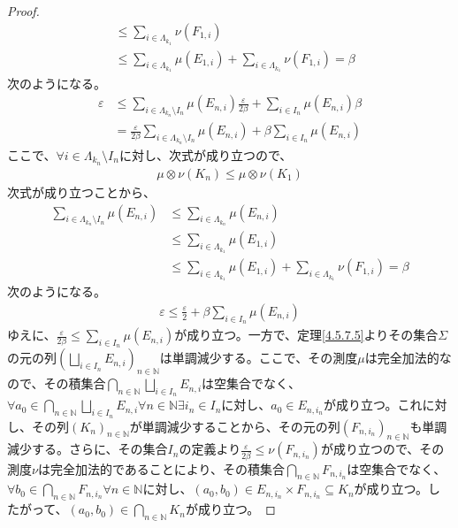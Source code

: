 \documentclass[dvipdfmx]{jsarticle}
\begin{document}
\begin{proof}
\begin{align*}
&\leq \sum_{i \in \varLambda_{k_{1}}} {\nu\left( F_{1,i} \right)}\\
&\leq \sum_{i \in \varLambda_{k_{1}}} {\mu\left( E_{1,i} \right)} + \sum_{i \in \varLambda_{k_{1}}} {\nu\left( F_{1,i} \right)} = \beta
\end{align*}
次のようになる。
\begin{align*}
\varepsilon &\leq \sum_{i \in \varLambda_{k_{n}} \setminus I_{n}} {\mu\left( E_{n,i} \right)\frac{\varepsilon}{2\beta}} + \sum_{i \in I_{n}} {\mu\left( E_{n,i} \right)\beta}\\
&= \frac{\varepsilon}{2\beta}\sum_{i \in \varLambda_{k_{n}} \setminus I_{n}} {\mu\left( E_{n,i} \right)} + \beta\sum_{i \in I_{n}} {\mu\left( E_{n,i} \right)}
\end{align*}
ここで、$\forall i \in \varLambda_{k_{n}} \setminus I_{n}$に対し、次式が成り立つので、
\begin{align*}
\mu \otimes \nu\left( K_{n} \right) \leq \mu \otimes \nu\left( K_{1} \right)
\end{align*}
次式が成り立つことから、
\begin{align*}
\sum_{i \in \varLambda_{k_{n}} \setminus I_{n}} {\mu\left( E_{n,i} \right)} &\leq \sum_{i \in \varLambda_{k_{n}}} {\mu\left( E_{n,i} \right)}\\
&\leq \sum_{i \in \varLambda_{k_{1}}} {\mu\left( E_{1,i} \right)}\\
&\leq \sum_{i \in \varLambda_{k_{1}}} {\mu\left( E_{1,i} \right)} + \sum_{i \in \varLambda_{k_{1}}} {\nu\left( F_{1,i} \right)} = \beta
\end{align*}
次のようになる。
\begin{align*}
\varepsilon \leq \frac{\varepsilon}{2} + \beta\sum_{i \in I_{n}} {\mu\left( E_{n,i} \right)}
\end{align*}
ゆえに、$\frac{\varepsilon}{2\beta} \leq \sum_{i \in I_{n}} {\mu\left( E_{n,i} \right)}$が成り立つ。一方で、定理\ref{4.5.7.5}よりその集合$\varSigma$の元の列$\left( \bigsqcup_{i \in I_{n}} E_{n,i} \right)_{n \in \mathbb{N}}$は単調減少する。ここで、その測度$\mu$は完全加法的なので、その積集合$\bigcap_{n \in \mathbb{N}} {\bigsqcup_{i \in I_{n}} E_{n,i}}$は空集合でなく、$\forall a_{0} \in \bigcap_{n \in \mathbb{N}} {\bigsqcup_{i \in I_{n}} E_{n,i}}\forall n \in \mathbb{N}\exists i_{n} \in I_{n}$に対し、$a_{0} \in E_{n,i_{n}}$が成り立つ。これに対し、その列$\left( K_{n} \right)_{n \in \mathbb{N}}$が単調減少することから、その元の列$\left( F_{n,i_{n}} \right)_{n \in \mathbb{N}}$も単調減少する。さらに、その集合$I_{n}$の定義より$\frac{\varepsilon}{2\beta} \leq \nu\left( F_{n,i_{n}} \right)$が成り立つので、その測度$\nu$は完全加法的であることにより、その積集合$\bigcap_{n \in \mathbb{N}} F_{n,i_{n}}$は空集合でなく、$\forall b_{0} \in \bigcap_{n \in \mathbb{N}} F_{n,i_{n}}\forall n \in \mathbb{N}$に対し、$\left( a_{0},b_{0} \right) \in E_{n,i_{n}} \times F_{n,i_{n}} \subseteq K_{n}$が成り立つ。したがって、$\left( a_{0},b_{0} \right) \in \bigcap_{n \in \mathbb{N}} K_{n}$が成り立つ。\par

\end{proof}
\end{document}
